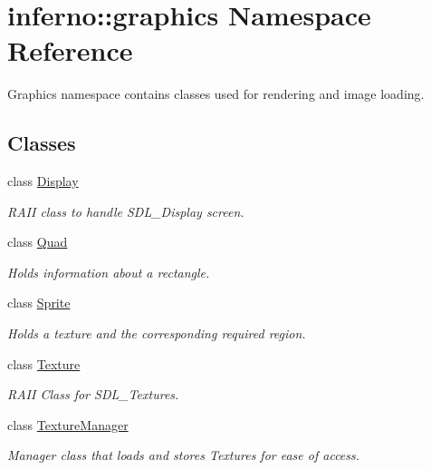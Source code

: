 \hypertarget{namespaceinferno_1_1graphics}{}\section{inferno\+:\+:graphics Namespace Reference}
\label{namespaceinferno_1_1graphics}


Graphics namespace contains classes used for rendering and image loading.  


\subsection*{Classes}
\begin{DoxyCompactItemize}
\item 
class \mbox{\hyperlink{classinferno_1_1graphics_1_1_display}{Display}}
\begin{DoxyCompactList}\small\item\em R\+A\+II class to handle S\+D\+L\+\_\+\+Display screen. \end{DoxyCompactList}\item 
class \mbox{\hyperlink{classinferno_1_1graphics_1_1_quad}{Quad}}
\begin{DoxyCompactList}\small\item\em Holds information about a rectangle. \end{DoxyCompactList}\item 
class \mbox{\hyperlink{classinferno_1_1graphics_1_1_sprite}{Sprite}}
\begin{DoxyCompactList}\small\item\em Holds a texture and the corresponding required region. \end{DoxyCompactList}\item 
class \mbox{\hyperlink{classinferno_1_1graphics_1_1_texture}{Texture}}
\begin{DoxyCompactList}\small\item\em R\+A\+II Class for S\+D\+L\+\_\+\+Textures. \end{DoxyCompactList}\item 
class \mbox{\hyperlink{classinferno_1_1graphics_1_1_texture_manager}{Texture\+Manager}}
\begin{DoxyCompactList}\small\item\em Manager class that loads and stores Textures for ease of access. \end{DoxyCompactList}\end{DoxyCompactItemize}
